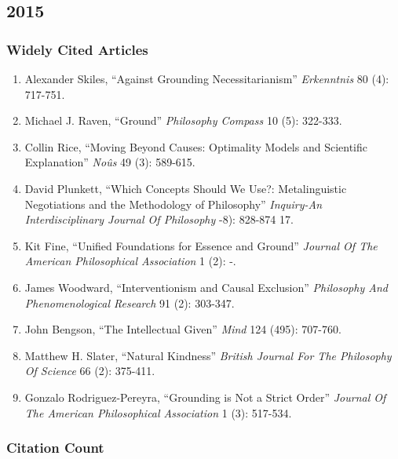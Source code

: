 \documentclass[
  10pt,
  letterpaper,
  DIV=11,
  numbers=noendperiod,
  twoside]{scrartcl}
\providecommand{\tightlist}{%
  \setlength{\itemsep}{0pt}\setlength{\parskip}{0pt}}\usepackage{longtable,booktabs,array}
\begin{document}
\newpage

\subsection{2015}\label{section-39}

\subsubsection*{Widely Cited Articles}\label{widely-cited-articles-39}

\begin{enumerate}
\def\labelenumi{\arabic{enumi}.}
\tightlist
\item
  Alexander Skiles, ``Against Grounding Necessitarianism''
  \emph{Erkenntnis} 80 (4): 717-751.
\item
  Michael J. Raven, ``Ground'' \emph{Philosophy Compass} 10 (5):
  322-333.
\item
  Collin Rice, ``Moving Beyond Causes: Optimality Models and Scientific
  Explanation'' \emph{Noûs} 49 (3): 589-615.
\item
  David Plunkett, ``Which Concepts Should We Use?: Metalinguistic
  Negotiations and the Methodology of Philosophy'' \emph{Inquiry-An
  Interdisciplinary Journal Of Philosophy} -8): 828-874 17.
\item
  Kit Fine, ``Unified Foundations for Essence and Ground'' \emph{Journal
  Of The American Philosophical Association} 1 (2): -.
\item
  James Woodward, ``Interventionism and Causal Exclusion''
  \emph{Philosophy And Phenomenological Research} 91 (2): 303-347.
\item
  John Bengson, ``The Intellectual Given'' \emph{Mind} 124 (495):
  707-760.
\item
  Matthew H. Slater, ``Natural Kindness'' \emph{British Journal For The
  Philosophy Of Science} 66 (2): 375-411.
\item
  Gonzalo Rodriguez-Pereyra, ``Grounding is Not a Strict Order''
  \emph{Journal Of The American Philosophical Association} 1 (3):
  517-534.
\end{enumerate}

\subsubsection*{Citation Count}\label{citation-count-39}
\end{document}
